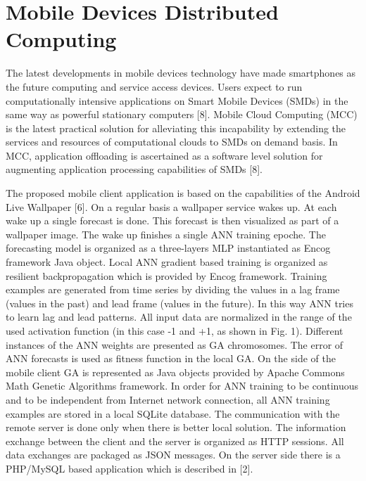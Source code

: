 \documentclass{llncs}
\begin{document}
\section{Mobile Devices Distributed Computing}
%
The latest developments in mobile devices technology have made smartphones as the future computing and service access devices. Users expect to run computationally intensive applications on Smart Mobile Devices (SMDs) in the same way as powerful stationary computers [8]. Mobile Cloud Computing (MCC) is the latest practical solution for alleviating this incapability by extending the services and resources of computational clouds to SMDs on demand basis. In MCC, application offloading is ascertained as a software level solution for augmenting application processing capabilities of SMDs [8]. 

The proposed mobile client application is based on the capabilities of the Android Live Wallpaper [6]. On a regular basis a wallpaper service wakes up. At each wake up a single forecast is done. This forecast is then visualized as part of a wallpaper image. The wake up finishes a single ANN training epoche. The forecasting model is organized as a three-layers MLP instantiated as Encog framework Java object. Local ANN gradient based training is organized as resilient backpropagation which is provided by Encog framework. Training examples are generated from time series by dividing the values in a lag frame (values in the past) and lead frame (values in the future). In this way ANN tries to learn lag and lead patterns. All input data are normalized in the range of the used activation function (in this case -1 and +1, as shown in Fig. 1). Different instances of the ANN weights are presented as GA chromosomes. The error of ANN forecasts is used as fitness function in the local GA. On the side of the mobile client GA is represented as Java objects provided by Apache Commons Math Genetic Algorithms framework. In order for ANN training to be continuous and to be independent from Internet network connection, all ANN training examples are stored in a local SQLite database. The communication with the remote server is done only when there is better local solution. The information exchange between the client and the server is organized as HTTP sessions. All data exchanges are packaged as JSON messages. On the server side there is a PHP/MySQL based application which is described in [2]. 
%
\end{document}
